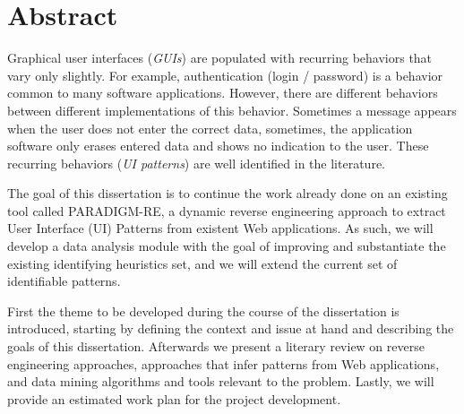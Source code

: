 \chapter*{Abstract}
Graphical user interfaces (\textit{GUIs}) are populated with recurring behaviors that vary only slightly. For example, authentication (login / password) is a behavior common to many software applications. However, there are different behaviors between different implementations of this behavior. Sometimes a message appears when the user does not enter the correct data, sometimes, the application software only erases entered data and shows no indication to the user. These recurring behaviors (\textit{UI patterns}) are well identified in the literature.

The goal of this dissertation is to continue the work already done on an existing tool called PARADIGM-RE, a dynamic reverse engineering approach to extract User Interface (UI) Patterns from existent Web applications. As such, we will develop a data analysis module with the goal of improving and substantiate the existing identifying heuristics set, and we will extend the current set of identifiable patterns.

First the theme to be developed during the course of the dissertation is introduced, starting by defining the context and issue at hand and describing the goals of this dissertation. Afterwards we present a literary review on reverse engineering approaches, approaches that infer patterns from Web applications, and data mining algorithms and tools relevant to the problem. Lastly, we will provide an estimated work plan for the project development.

